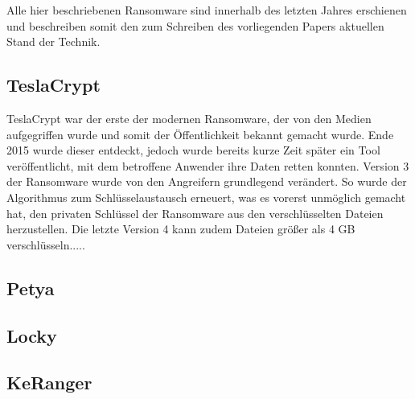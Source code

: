 Alle hier beschriebenen Ransomware sind innerhalb des letzten Jahres erschienen und beschreiben somit den zum Schreiben des vorliegenden Papers aktuellen Stand der Technik.

\subsection{TeslaCrypt}
TeslaCrypt war der erste der modernen Ransomware, der von den Medien aufgegriffen wurde und somit der Öffentlichkeit bekannt gemacht wurde. Ende 2015\cite{tesla:entdeckt} wurde dieser entdeckt, jedoch wurde bereits kurze Zeit später ein Tool veröffentlicht\cite{tesla:geknackt}, mit dem betroffene Anwender ihre Daten retten konnten.
Version 3 der Ransomware wurde von den Angreifern grundlegend verändert. So wurde der Algorithmus zum Schlüsselaustausch erneuert, was es vorerst unmöglich gemacht hat, den privaten Schlüssel der Ransomware aus den verschlüsselten Dateien herzustellen\cite{tesla:version3}\cite{tesla:version3_2}.
Die letzte Version 4 kann zudem Dateien größer als 4 GB verschlüsseln\cite{tesla:version4}.....
		
\subsection{Petya}
\subsection{Locky}
\subsection{KeRanger}